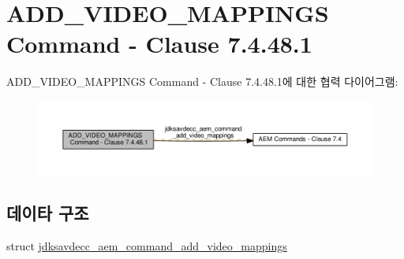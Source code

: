 \hypertarget{group__command__add__video__mappings}{}\section{A\+D\+D\+\_\+\+V\+I\+D\+E\+O\+\_\+\+M\+A\+P\+P\+I\+N\+GS Command -\/ Clause 7.4.48.1}
\label{group__command__add__video__mappings}
A\+D\+D\+\_\+\+V\+I\+D\+E\+O\+\_\+\+M\+A\+P\+P\+I\+N\+GS Command -\/ Clause 7.4.48.1에 대한 협력 다이어그램\+:
\nopagebreak
\begin{figure}[H]
\begin{center}
\leavevmode
\includegraphics[width=350pt]{group__command__add__video__mappings}
\end{center}
\end{figure}
\subsection*{데이타 구조}
\begin{DoxyCompactItemize}
\item 
struct \hyperlink{structjdksavdecc__aem__command__add__video__mappings}{jdksavdecc\+\_\+aem\+\_\+command\+\_\+add\+\_\+video\+\_\+mappings}
\end{DoxyCompactItemize}
